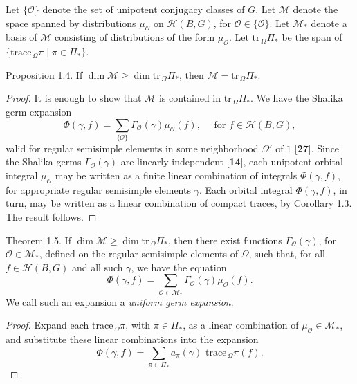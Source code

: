 \documentclass{amsart}
\begin{document}
Let 
  $ \{ \mathcal O \} $
denote the set of unipotent conjugacy classes of $G$.
Let 
  $ \mathcal M $
denote the space spanned by distributions
  $ \mu_{\mathcal O} $ 
on
  $ {\mathcal H} (B,G) $,
  for
  $ \mathcal O \in \{ \mathcal O \} $.
Let 
  $ {\mathcal M}_* $
denote a basis of
  ${\mathcal M}$
consisting of distributions of the form
  $ \mu_{\mathcal O} $.
Let
  $\text{tr}_{\,\Omega}\Pi_*$
be the span of 
  $ \{ \text{trace}_{\,\Omega} \pi \mid \pi
     \in \Pi_* \} $.

\proclaim Proposition {1.4}.
If 
  $ \dim {\mathcal M} \geq \dim \text{tr}_{\,\Omega}\Pi_*$,
then
  $ {\mathcal M} = \text{tr}_{\,\Omega}\Pi_*$.
\finishproclaim

\begin{proof} 
It is enough to show that ${\mathcal M}$ is contained in $\text{tr}_{\,\Omega}\Pi_*$.
We have the Shalika germ expansion
$$\Phi(\gamma,f) = \sum_{\{{\mathcal O}\}}\Gamma_{\mathcal O}(\gamma)\mu_{\mathcal O}(f),
	\quad \text { for } f\in {\mathcal H}(B,G),$$
valid for regular semisimple elements in some neighborhood 
$\Omega'$ of $1$ [{\bf 27}].   Since the Shalika germs
$\Gamma_{\mathcal O}(\gamma)$ are linearly independent [{\bf 14}],
each unipotent orbital integral $\mu_{\mathcal O}$ may be written
as a finite linear combination of integrals $\Phi(\gamma,f)$,
for appropriate regular semisimple elements $\gamma$.  Each
orbital integral $\Phi(\gamma,f)$, in turn, may be written
as a linear combination of compact traces, by Corollary 1.3.
The result follows.
\end{proof}


\proclaim Theorem {1.5}.
If 
   $ \dim {\mathcal M} \geq \dim \text{tr}_{\,\Omega}\Pi_*$,
then there exist functions
  $ \Gamma_{\mathcal O} (\gamma) $, for ${\mathcal O}\in{\mathcal M}_*$,  defined on the
  regular semisimple elements of
  $ \Omega $,
such that, for all
  $ f \in {\mathcal H} (B,G) $
and all such 
  $ \gamma  $, we have the equation
%
$$
  \Phi (\gamma,f) =
  \sum_{{\mathcal O}\in{\mathcal M}_*}
  \Gamma_{\mathcal O}
  (\gamma) \mu_{\mathcal O} (f).
$$
%
\finishproclaim
\noindent
We call such an expansion a {\it uniform germ expansion}.

\begin{proof}
Expand each
  $ \text{trace}_{\,\Omega}\pi $, with  
  $ \pi \in \Pi_* $,
as a linear combination of
  $ \mu_{\mathcal O} \in {\mathcal M}_* $,
and substitute these linear combinations into the expansion
%
$$
  \Phi(\gamma,f) =
  \sum_{\pi\in\Pi_*}
  a_{\pi}(\gamma) \,\, \text{trace}_{\,\Omega} \pi(f).
$$
\end{proof}
\end{document}
